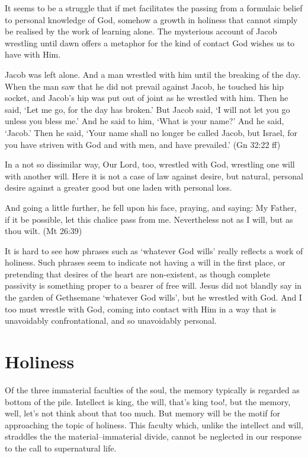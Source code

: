 \documentclass[12pt]{article}
\begin{document}
It seems to be a struggle that if met facilitates the passing from a formulaic belief to personal knowledge of God, somehow a growth in holiness that cannot simply be realised by the work of learning alone. The mysterious account of Jacob wrestling until dawn offers a metaphor for the kind of contact God wishes us to have with Him.
\begin{displayquote}
Jacob was left alone. And a man wrestled with him until the breaking of the day. When the man saw that he did not prevail against Jacob, he touched his hip socket, and Jacob's hip was put out of joint as he wrestled with him. Then he said, `Let me go, for the day has broken.' But Jacob said, `I will not let you go unless you bless me.' And he said to him, `What is your name?' And he said, `Jacob.' Then he said, `Your name shall no longer be called Jacob, but Israel, for you have striven with God and with men, and have prevailed.'
(Gn 32:22 ff)
\end{displayquote}
In a not so dissimilar way, Our Lord, too, wrestled with God, wrestling one will with another will. Here it is not a case of law against desire, but natural, personal desire against a greater good but one laden with personal loss.
\begin{displayquote}
And going a little further, he fell upon his face, praying, and saying: My Father, if it be possible, let this chalice pass from me. Nevertheless not as I will, but as thou wilt.
(Mt 26:39)
\end{displayquote}

It is hard to see how phrases such as `whatever God wills' really reflects a work of holiness. Such phrases seem to indicate not having a will in the first place, or pretending that desires of the heart are non-existent, as though complete passivity is something proper to a bearer of free will. Jesus did not blandly say in the garden of Gethsemane `whatever God wills', but he wrestled with God. And I too must wrestle with God, coming into contact with Him in a way that is unavoidably confrontational, and so unavoidably personal.

\section*{Holiness}

Of the three immaterial faculties of the soul, the memory typically is regarded as bottom of the pile. Intellect is king, the will, that's king too!, but the memory, well, let's not think about that too much. But memory will be the motif for approaching the topic of holiness. This faculty which, unlike the intellect and will, straddles the the material--immaterial divide,  cannot be neglected in our response to the call to supernatural life.
\end{document}
